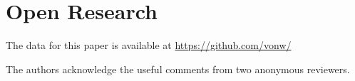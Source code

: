 \documentclass{agujournal2019}
\begin{document}
\section*{Open Research}
The data for this paper is available at \href{https://github.com/vonw/}{https://github.com/vonw/}



\acknowledgments
The authors acknowledge the useful comments from two anonymous reviewers.


%
%


%
%
%
%
%
\end{document}
